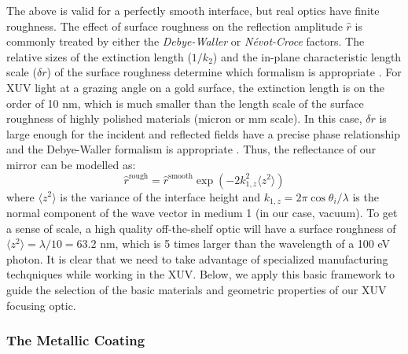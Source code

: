 The above is valid for a perfectly smooth interface, but real optics have finite roughness. The effect of surface roughness on the reflection amplitude $\hat{r}$ is commonly treated by either the \textit{Debye-Waller} or \textit{N\'evot-Croce} factors. The relative sizes of the extinction length ($1/k_2$) and the in-plane characteristic length scale ($\delta r$) of the surface roughness determine which formalism is appropriate \cite{sentenacStatisticalAspectsWave2009, gibaudSpecularReflectivitySmooth2009}. For XUV light at a grazing angle on a gold surface, the extinction length is on the order of 10 nm, which is much smaller than the length scale of the surface roughness of highly polished materials (micron or mm scale). In this case, $\delta r$ is large enough for the incident and reflected fields have a precise phase relationship and the Debye-Waller formalism is appropriate \cite{stoevReviewGrazingIncidence1999}. Thus, the reflectance of our mirror can be modelled as:
\begin{equation}
\hat{r}^{\textrm{rough}} = \hat{r}^{\textrm{smooth}} \exp \left( -2 k_{1,z}^2 \langle z^2 \rangle \right)
\label{eqn:DW_2}
\end{equation}
where $ \langle z^2 \rangle$ is the variance of the interface height and $k_{1,z} = 2 \pi \cos \theta_i / \lambda$ is the normal component of the wave vector in medium 1 (in our case, vacuum). To get a sense of scale, a high quality off-the-shelf optic will have a surface roughness of $\langle z^2 \rangle = \lambda/10 = 63.2 \text{ nm}$, which is 5 times larger than the wavelength of a 100 eV photon. It is clear that we need to take advantage of specialized manufacturing techqniques while working in the XUV. Below, we apply this basic framework to guide the selection of the basic materials and geometric properties of our XUV focusing optic. 

\subsubsection{The Metallic Coating}

